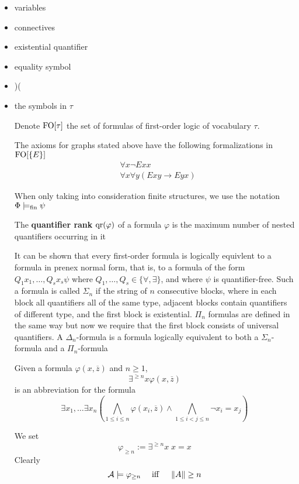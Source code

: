 \documentclass[11pt]{article}
\begin{document}
\begin{itemize}
\item variables
\item connectives
\item existential quantifier
\item equality symbol
\item )(
\item the symbols in \(\tau\)

Denote \(\text{FO}[\tau]\) the set of formulas of first-order logic of vocabulary
\(\tau\).

The axioms for graphs stated above have the following formalizations in \(\text{FO}[\{E\}]\)
\begin{align*}
&\forall x\neg Exx\\
&\forall x\forall y(Exy\to Eyx)
\end{align*}

When only taking into consideration finite structures, we use the notation
\(\Phi\models_{\operatorname{fin}}\psi\)

The \textbf{quantifier rank} \(\operatorname{qr}(\varphi)\) of a formula \(\varphi\) is the maximum
number of nested quantifiers occurring in it

It can be shown that every first-order formula is logically equivlent to a
formula in prenex normal form, that is, to a formula of the form
\(Q_1x_1,\dots,Q_sx_s\psi\) where \(Q_1,\dots,Q_s\in\{\forall,\exists\}\),
and where \(\psi\) is quantifier-free. Such a formula is called \(\Sigma_n\) if
the string of \(n\) consecutive blocks, where in each block all quantifiers
all of the same type, adjacent blocks contain quantifiers of different type,
and the first block is existential. \(\Pi_n\) formulas are defined in the
same way but now we require that the first block consists of universal
quantifiers. A \(\Delta_n\)-formula is a formula logically equivalent to
both a \(\Sigma_n\)-formula and a \(\Pi_n\)-formula

Given a formula \(\varphi(x,\overbar{z})\) and \(n\ge1\),
\begin{equation*}
\exists^{\ge n}x\varphi(x,\overbar{z})
\end{equation*}
is an abbreviation for the formula
\begin{equation*}
\exists x_1,\dots\exists x_n(
\bigwedge_{1\le i\le n}\varphi(x_i,\overbar{z})\wedge
\bigwedge_{1\le i<j\le n}\neg x_i=x_j)
\end{equation*}

We set
\begin{equation*}
\varphi_{\ge n}:=\exists^{\ge n}x\;x=x
\end{equation*}
Clearly
\begin{equation*}
\mathcal{A}\models\varphi_{\ge n}\quad\text{ iff }\quad\left\lVert A\right\rVert\ge n
\end{equation*}
\end{itemize}
\end{document}

